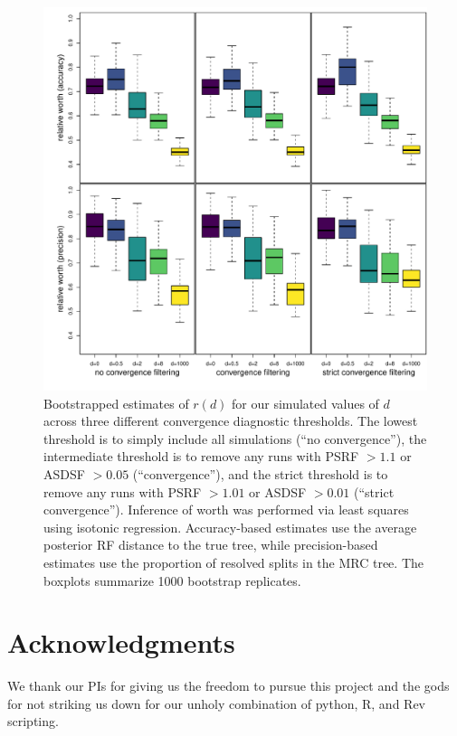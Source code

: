 \documentclass[11pt]{article}
\begin{document}
\begin{figure}
  \centering
  \includegraphics[width=\textwidth]{figures/relative_worth_sensitivity.pdf}
  \caption{
    Bootstrapped estimates of $r(d)$ for our simulated values of $d$ across three different convergence diagnostic thresholds.
    The lowest threshold is to simply include all simulations (``no convergence''), the intermediate threshold is to remove any runs with PSRF $> 1.1$ or ASDSF $> 0.05$ (``convergence''), and the strict threshold is to remove any runs with PSRF $> 1.01$ or ASDSF $> 0.01$ (``strict convergence'').
    Inference of worth was performed via least squares using isotonic regression.
    Accuracy-based estimates use the average posterior RF distance to the true tree, while precision-based estimates use the proportion of resolved splits in the MRC tree.
    The boxplots summarize 1000 bootstrap replicates.
  }
  \label{fig:worth_sensitivity}
\end{figure}
\section*{Acknowledgments}
We thank our PIs for giving us the freedom to pursue this project and the gods for not striking us down for our unholy combination of python, R, and Rev scripting.



\end{document}
